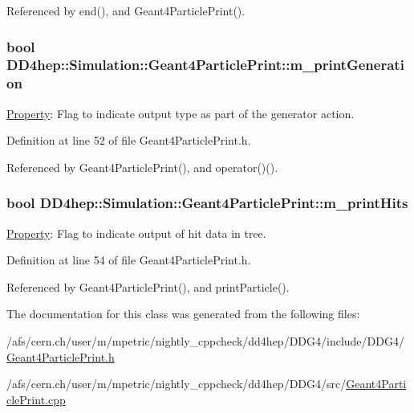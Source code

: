 Referenced by end(), and Geant4ParticlePrint().\hypertarget{class_d_d4hep_1_1_simulation_1_1_geant4_particle_print_aa9e8a756d0ffc2d753d32941780d8f99}{
\subsubsection[{m\_\-printGeneration}]{\setlength{\rightskip}{0pt plus 5cm}bool {\bf DD4hep::Simulation::Geant4ParticlePrint::m\_\-printGeneration}}}
\label{class_d_d4hep_1_1_simulation_1_1_geant4_particle_print_aa9e8a756d0ffc2d753d32941780d8f99}


\hyperlink{class_d_d4hep_1_1_property}{Property}: Flag to indicate output type as part of the generator action. 

Definition at line 52 of file Geant4ParticlePrint.h.

Referenced by Geant4ParticlePrint(), and operator()().\hypertarget{class_d_d4hep_1_1_simulation_1_1_geant4_particle_print_ab411968553cdfbc30a79a385c0fa25c4}{
\subsubsection[{m\_\-printHits}]{\setlength{\rightskip}{0pt plus 5cm}bool {\bf DD4hep::Simulation::Geant4ParticlePrint::m\_\-printHits}}}
\label{class_d_d4hep_1_1_simulation_1_1_geant4_particle_print_ab411968553cdfbc30a79a385c0fa25c4}


\hyperlink{class_d_d4hep_1_1_property}{Property}: Flag to indicate output of hit data in tree. 

Definition at line 54 of file Geant4ParticlePrint.h.

Referenced by Geant4ParticlePrint(), and printParticle().

The documentation for this class was generated from the following files:\begin{DoxyCompactItemize}
\item 
/afs/cern.ch/user/m/mpetric/nightly\_\-cppcheck/dd4hep/DDG4/include/DDG4/\hyperlink{_geant4_particle_print_8h}{Geant4ParticlePrint.h}\item 
/afs/cern.ch/user/m/mpetric/nightly\_\-cppcheck/dd4hep/DDG4/src/\hyperlink{_geant4_particle_print_8cpp}{Geant4ParticlePrint.cpp}\end{DoxyCompactItemize}
